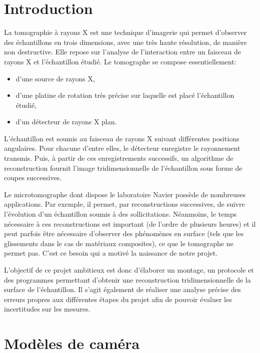 \documentclass[11pt]{report}
\begin{document}
\tableofcontents

\chapter*{Introduction}

La tomographie à rayons X est une technique d'imagerie qui permet d'observer des échantillons en trois dimensions, avec une très haute résolution, de manière non destructive. Elle repose sur l'analyse de l'interaction entre un faisceau de rayons X et l'échantillon étudié. Le tomographe se compose essentiellement:
\begin{itemize}
    \item d'une source de rayons X,
    \item d'une platine de rotation très précise sur laquelle est placé l'échantillon étudié,
    \item d'un détecteur de rayons X plan.
\end{itemize}

L'échantillon est soumis au faisceau de rayons X suivant différentes positions angulaires. Pour chacune d'entre elles, le détecteur enregistre le rayonnement transmis. Puis, à partir de ces enregistrements successifs, un algorithme de reconstruction fournit l'image tridimensionnelle de l'échantillon sous forme de coupes successives.

Le microtomographe dont dispose le laboratoire Navier possède de nombreuses applications. Par exemple, il permet, par reconstructions successives, de suivre l'évolution d'un échantillon soumis à des sollicitations. Néanmoins, le temps nécessaire à ces reconstructions est important (de l'ordre de plusieurs heures) et il peut parfois être nécessaire d'observer des phénomènes en surface (tels que les glissements dans le cas de matériaux composites), ce que le tomographe ne permet pas. C'est ce besoin qui a motivé la naissance de notre projet.

L'objectif de ce projet ambitieux est donc d'élaborer un montage, un protocole et des programmes permettant d'obtenir une reconstruction tridimensionnelle de la surface de l'échantillon. Il s'agit également de réaliser une analyse précise des erreurs propres aux différentes étapes du projet afin de pouvoir évaluer les incertitudes sur les mesures.

\chapter{Modèles de caméra}
\end{document}
